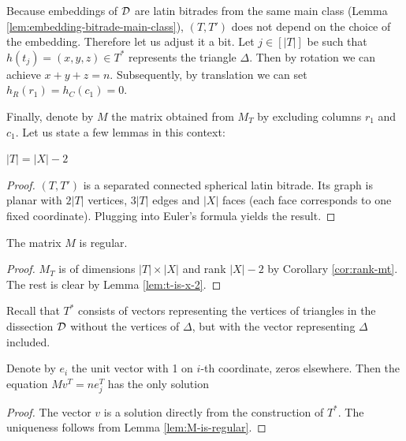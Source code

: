Because embeddings of $\mathcal D$ are latin bitrades from the same main class (Lemma \ref{lem:embedding-bitrade-main-class}), $(T,T')$ does not depend on the choice of the embedding. Therefore let us adjust it a bit. Let $j \in [|T|]$ be such that $h(t_j) = (x,y,z) \in T^*$ represents the triangle $\Delta$. Then by rotation we can achieve $x + y + z = n$. Subsequently, by translation we can set $h_R(r_1) = h_C(c_1) = 0$.

Finally, denote by $M$ the matrix obtained from $M_T$ by excluding columns $r_1$ and $c_1$. Let us state a few lemmas in this context:

\begin{lem}
\label{lem:t-is-x-2}
$|T| = |X|-2$
\end{lem}
\begin{proof}
$(T, T')$ is a separated connected spherical latin bitrade. Its graph is planar with $2|T|$ vertices, $3|T|$ edges and $|X|$ faces (each face corresponds to one fixed coordinate). Plugging into Euler's formula yields the result.
\end{proof}

\begin{lem}
\label{lem:M-is-regular}
The matrix $M$ is regular.
\end{lem}
\begin{proof}
$M_T$ is of dimensions $|T|\times|X|$ and rank $|X|-2$ by Corollary \ref{cor:rank-mt}. The rest is clear by Lemma \ref{lem:t-is-x-2}.
\end{proof}

Recall that $T^*$ consists of vectors representing the vertices of triangles in the dissection $\mathcal D$ without the vertices of $\Delta$, but with the vector representing $\Delta$ included.

\begin{lem}
\label{lem:solution-n-0-0-0}
Denote by $e_i$ the unit vector with 1 on $i$-th coordinate, zeros elsewhere. Then the equation $Mv^T = ne_j^T$ has the only solution
%
\end{lem}
\begin{proof}
The vector $v$ is a solution directly from the construction of $T^*$. The uniqueness follows from Lemma \ref{lem:M-is-regular}.
\end{proof}

